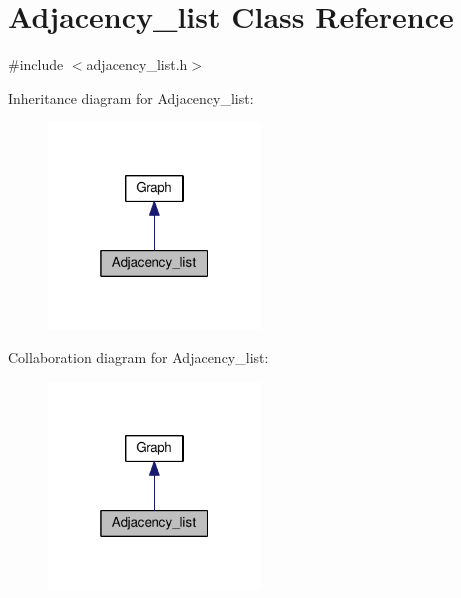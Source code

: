 \hypertarget{classAdjacency__list}{\section{Adjacency\-\_\-list Class Reference}
\label{classAdjacency__list}
}


{\ttfamily \#include $<$adjacency\-\_\-list.\-h$>$}



Inheritance diagram for Adjacency\-\_\-list\-:
\nopagebreak
\begin{figure}[H]
\begin{center}
\leavevmode
\includegraphics[width=160pt]{classAdjacency__list__inherit__graph}
\end{center}
\end{figure}


Collaboration diagram for Adjacency\-\_\-list\-:
\nopagebreak
\begin{figure}[H]
\begin{center}
\leavevmode
\includegraphics[width=160pt]{classAdjacency__list__coll__graph}
\end{center}
\end{figure}
